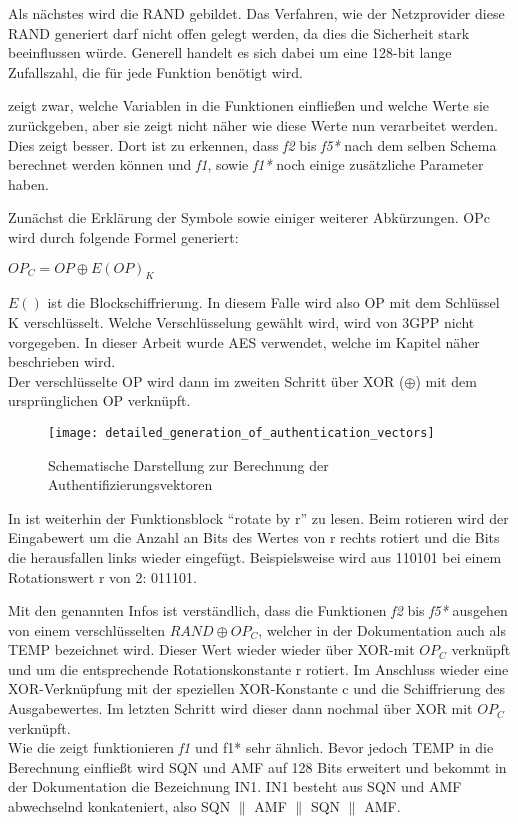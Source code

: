  Als nächstes wird die \ac{RAND} gebildet. Das Verfahren, wie der Netzprovider diese RAND generiert darf nicht offen gelegt werden, da dies die Sicherheit stark beeinflussen würde. Generell handelt es sich dabei um eine 128-bit lange Zufallszahl, die für jede Funktion benötigt wird.
 
  zeigt zwar, welche Variablen in die Funktionen einfließen und welche Werte sie zurückgeben, aber sie zeigt nicht näher wie diese Werte nun verarbeitet werden. Dies zeigt  besser. Dort ist zu erkennen, dass \emph{f2} bis \emph{f5*} nach dem selben Schema berechnet werden können und \emph{f1}, sowie \emph{f1*} noch einige zusätzliche Parameter haben.
 
 Zunächst die Erklärung der Symbole sowie einiger weiterer Abkürzungen. \ac{OPc} wird durch folgende Formel generiert:
 \begin{center}
  $OP_{C} = OP \oplus E(OP)_{K}$
 \end{center}
 
 $E()$ ist die Blockschiffrierung. In diesem Falle wird also \ac{OP} mit dem Schlüssel \ac{K} verschlüsselt. Welche Verschlüsselung gewählt wird, wird von 3GPP nicht vorgegeben. In dieser Arbeit wurde \ac{AES} verwendet, welche im Kapitel  näher beschrieben wird. \\
 Der verschlüsselte OP wird dann im zweiten Schritt über XOR ($\oplus$) mit dem ursprünglichen OP verknüpft.
 
 \begin{figure}[ht]
  \begin{center}
   \texttt{[image: detailed\_generation\_of\_authentication\_vectors]}
  \end{center}
  \caption{Schematische Darstellung zur Berechnung der Authentifizierungsvektoren \cite{3gpp.33.102}}
  \label{fig:schematisch_milenage}
 \end{figure}
 
 In  ist weiterhin der Funktionsblock ``rotate by r'' zu lesen. Beim rotieren wird der Eingabewert um die Anzahl an Bits des Wertes von r rechts rotiert und die Bits die herausfallen links wieder eingefügt. Beispielsweise wird aus 110101 bei einem Rotationswert r von 2: 011101.
 
 Mit den genannten Infos ist verständlich, dass die Funktionen \emph{f2} bis \emph{f5*} ausgehen von einem verschlüsselten $RAND \oplus OP_{C}$, welcher in der Dokumentation auch als TEMP bezeichnet wird. Dieser Wert wieder wieder über XOR-mit $OP_ {C}$ verknüpft und um die entsprechende Rotationskonstante r rotiert. Im Anschluss wieder eine XOR-Verknüpfung mit der speziellen XOR-Konstante c und die Schiffrierung des Ausgabewertes. Im letzten Schritt wird dieser dann nochmal über XOR mit $OP_{C}$ verknüpft. \\
 Wie die  zeigt funktionieren \emph{f1} und {f1*} sehr ähnlich. Bevor jedoch TEMP in die Berechnung einfließt wird SQN und AMF auf 128 Bits erweitert und bekommt in der Dokumentation die Bezeichnung IN1. IN1 besteht aus SQN und AMF abwechselnd konkateniert, also SQN $\|$ AMF $\|$ SQN $\|$ AMF. \cite{3gpp.33.102}
 
